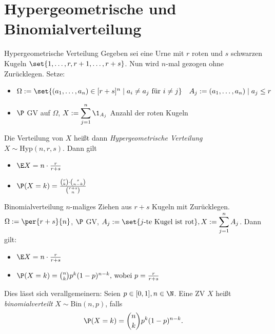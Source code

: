 \section*{Hypergeometrische und Binomialverteilung}
 \begin{karte}{Hypergeometrische Verteilung}
 	Gegeben sei eine Urne mit $r$ roten und $s$ schwarzen Kugeln $\set{1,\dotsc,r,r+1,\dotsc,r+s}$. Nun wird $n$-mal gezogen ohne Zurücklegen. Setze:
 	\begin{itemize}
 		\item $\Omega := \set{(a_1,\dotsc,a_n) \in [r+s]^n \;|\; a_i \neq a_j \text{ für } i \neq j} \quad A_j := {(a_1,\dotsc,a_n) \;|\; a_j \leq r}$
 		\item $\P$ GV auf $\Omega$, $\displaystyle X:= \sum_{j=1}^{n} \1_{A_j}$ Anzahl der roten Kugeln
 	\end{itemize}
 	Die Verteilung von $X$ heißt dann \textit{Hypergeometrische Verteilung} $X \sim \text{Hyp}(n,r,s)$. Dann gilt
 	\begin{itemize}
 		\item $\E X = n \cdot \frac{r}{r+s}$
 		\item $\P(X=k) = \frac{\binom{r}{k} \cdot \binom{s}{n-k}}{\binom{r+s}{n}}$
 	\end{itemize}
 \end{karte}

\begin{karte}{Binomialverteilung}
	$n$-maliges Ziehen aus $r+s$ Kugeln mit Zurücklegen. $\Omega := \per{r+s}{n}$, $\P$ GV, $A_j:=\set{j\text{-te Kugel ist rot}}, \displaystyle X := \sum_{j=1}^{n} A_j$. Dann gilt:
	\begin{itemize}
		\item $\E X = n \cdot \frac{r}{r+s}$
		\item $\P(X=k)=\binom{n}{k}p^k(1-p)^{n-k} \text{, wobei } p = \frac{r}{r+s}$ 
	\end{itemize}
	Dies lässt sich verallgemeinern: Seien $p \in [0,1], n \in \N$. Eine ZV $X$ heißt \textit{binomialverteilt} $X \sim \text{Bin}(n,p)$, falls  $$\P(X=k)=\binom{n}{k}p^k(1-p)^{n-k} \text{.}$$
\end{karte}